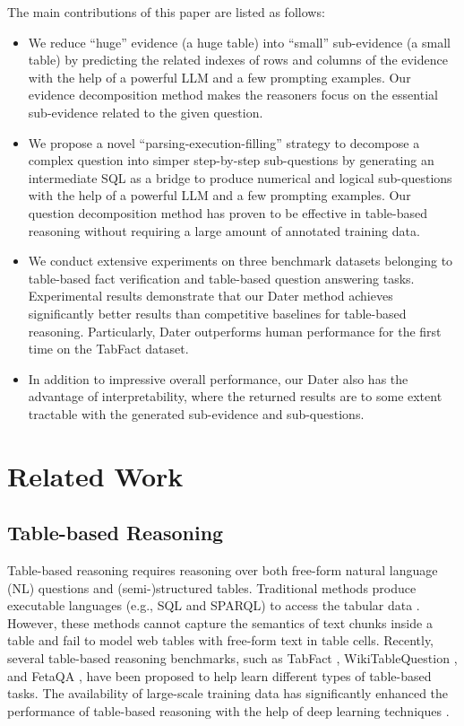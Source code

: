 \documentclass{article}
\begin{document}
The main contributions of this paper are listed as follows:
\begin{itemize}
    \item We reduce ``huge'' evidence (a huge table) into ``small'' sub-evidence (a small table) by predicting the related indexes of rows and columns of the evidence with the help of a powerful LLM and a few prompting examples. Our evidence decomposition method makes the reasoners focus on the essential sub-evidence related to the given question.
\item We propose a novel ``parsing-execution-filling'' strategy to decompose a complex question into simper step-by-step sub-questions by generating an intermediate SQL as a bridge to produce numerical and logical sub-questions with the help of a powerful LLM and a few prompting examples. Our question decomposition method has proven to be effective in table-based reasoning without requiring a large amount of annotated training data. 
    \item We conduct extensive experiments on three benchmark datasets belonging to table-based fact verification and table-based question answering tasks. Experimental results demonstrate that our Dater method achieves significantly better results than competitive baselines for table-based reasoning. Particularly, Dater outperforms human performance for the first time on the TabFact dataset. 
    \item In addition to impressive overall performance, our Dater also has the advantage of interpretability, where the returned results are to some extent tractable with the generated sub-evidence and sub-questions.
\end{itemize}

\section{Related Work}
\subsection{Table-based Reasoning}
Table-based reasoning requires reasoning over both free-form natural language (NL) questions and (semi-)structured tables. Traditional methods produce executable languages (e.g., SQL and SPARQL) to access the tabular data \citep{sqlguide,sparql}. However, these methods cannot capture the semantics of text chunks inside a table and fail to model web tables with free-form text in table cells. 
Recently, several table-based reasoning benchmarks, such as TabFact \citep{tabfact}, WikiTableQuestion \citep{wtq}, and FetaQA \citep{fetaqa},  have been proposed to help learn different types of table-based tasks.  The availability of large-scale training data has significantly enhanced the performance of table-based reasoning with the help of deep learning techniques \citep{neeraja2021incorporating,feverous}.  
\end{document}
